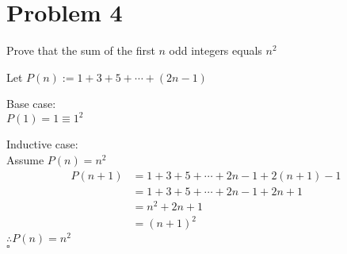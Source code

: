 \clearpage
\section*{Problem 4}

Prove that the sum of the first $n$ odd integers equals $n^2$

\noindent
Let $P(n):=1+3+5+\cdots+(2n-1)$

\noindent
Base case:\\
$P(1)=1\equiv1^2$

\noindent
Inductive case:\\
Assume $P(n)=n^2$
\begin{align*}
P(n+1)  &= 1+3+5+\cdots+2n-1+2(n+1)-1  \\
        &= 1+3+5+\cdots+2n-1+2n+1      \\
        &= n^2+2n+1                    \\
        &= (n+1)^2
\end{align*}
$\therefore P(n)=n^2$\\
$\square$